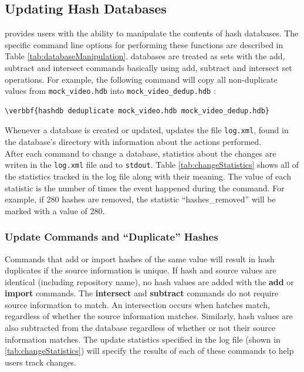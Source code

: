 \documentclass[11pt,fleqn]{article} %
\begin{document}
\subsection{Updating Hash Databases}
\label{updateSection}
\hdb provides users with the ability to manipulate the contents of hash databases. The specific command line options for performing these functions are described in Table \ref{tab:databaseManipulation}. \hdb databases are treated as sets with the add, subtract and intersect commands basically using add, subtract and intersect set operations. For example, the following command will  copy all non-duplicate values from \texttt{mock\_video.hdb} into \texttt{mock\_video\_dedup.hdb} :
\begin{Verbatim}[commandchars=\\\{\}]
\verbbf{hashdb deduplicate mock_video.hdb mock_video_dedup.hdb}
\end{Verbatim}
Whenever a database is created or updated, \hdb updates the file \texttt{log.xml}, found in the database's directory with information about the actions performed.\\

After each command to change a database, statistics about the changes are writen in the \texttt{log.xml} file and to \texttt{stdout}. Table \ref{tab:changeStatistics} shows all of the statistics tracked in the log file along with their meaning. The value of each statistic is the number of times the event happened during the command. For example, if 280 hashes are removed, the statistic ``hashes\_removed'' will be marked with a value of 280. \\

\subsubsection{Update Commands and ``Duplicate'' Hashes}
Commands that add or import hashes of the same value will result in hash duplicates if the source information is unique. If hash and source values are identical (including repository name), no hash values are added with the \textbf{add} or \textbf{import} commands. The \textbf{intersect} and \textbf{subtract} commands do not require source information to match. An intersection occurs when hatches match, regardless of whether the source information matches. Similarly, hash values are also subtracted from the database regardless of whether or not their source information matches.  The update statistics specified in the log file (shown in \ref{tab:changeStatistics}) will specify the results of each of these commands to help users track changes. \\
\end{document}
